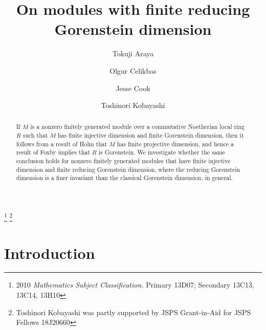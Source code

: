 \documentclass{amsart}
\theoremstyle{plain} %
\theoremstyle{definition}
\begin{document}
\baselineskip=15pt
\baselineskip=15pt
\title[On modules with finite reducing Gorenstein dimension]{On modules with finite reducing Gorenstein dimension}

\author{Tokuji Araya}
\address{Tokuji Araya \\ Department of Applied Science, Faculty of Science, Okayama University of Science, Ridaicho, Kitaku, Okayama 700-0005, Japan.}

\author{Olgur Celikbas}
\address{Olgur Celikbas\\ Department of Mathematics, West Virginia University, 
Morgantown, WV 26506 U.S.A}

\author{Jesse Cook}
\address{Jesse Cook \\ Department of Mathematics, West Virginia University, 
Morgantown, WV 26506 U.S.A}

\author{Toshinori Kobayashi} 
\address{Toshinori Kobayashi \\ Graduate School of Mathematics, Nagoya University, Furocho, Chikusaku, Nagoya, Aichi 464-8602, Japan}


\thanks{2010 {\em Mathematics Subject Classification.} Primary 13D07; Secondary 13C13, 13C14, 13H10}
\thanks{Toshinori Kobayashi was partly supported by JSPS Grant-in-Aid for JSPS Fellows 18J20660}

\begin{abstract} If $M$ is a nonzero finitely generated module over a commutative Noetherian local ring $R$ such that $M$ has finite injective dimension and finite Gorenstein dimension, then it follows from a result of Holm that $M$ has finite projective dimension, and hence a result of Foxby implies that $R$ is Gorenstein. We investigate whether the same conclusion holds for nonzero finitely generated modules that have finite injective dimension and finite reducing Gorenstein dimension, where the reducing Gorenstein dimension is a finer invariant than the classical Gorenstein dimension, in general.
\end{abstract}

\maketitle

\section{Introduction}
\end{document}
